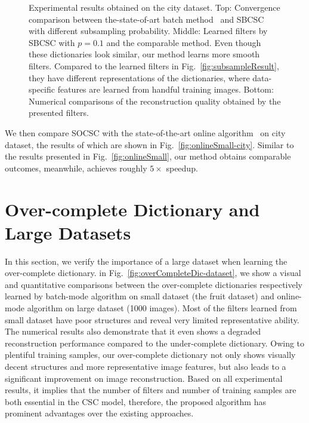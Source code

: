 \begin{figure}[h]

\caption{Experimental results obtained on the city dataset. Top: Convergence comparison between the-state-of-art batch method~\cite{heide2015fast} and SBCSC with different subsampling probability. Middle: Learned filters by SBCSC with $p=0.1$ and the comparable method. Even though these dictionaries look similar, our method learns more smooth filters. Compared to the learned filters in Fig.\ \ref{fig:subsampleResult}, they have different representations of the dictionaries, where data-specific features are learned from handful training images. Bottom: Numerical comparisons of the reconstruction quality obtained by the presented filters.}
\label{fig:subsampleResult-city}
\end{figure}

We then compare SOCSC with the state-of-the-art online algorithm~\cite{liu-2018-first} on city dataset, the results of which are shown in Fig.\ \ref{fig:onlineSmall-city}. Similar to the results presented in Fig.\ \ref{fig:onlineSmall}, our method obtains comparable outcomes, meanwhile, achieves roughly $5 \times$ speedup.

\section{Over-complete Dictionary and Large Datasets}
In this section, we verify the importance of a large dataset when learning the over-complete dictionary. in Fig.~\ref{fig:overCompleteDic-dataset}, we show a visual and quantitative comparisons between the over-complete dictionaries respectively learned by batch-mode algorithm on small dataset (the fruit dataset) and online-mode algorithm on large dataset (1000 images). Most of the filters learned from small dataset have poor structures and reveal very limited representative ability. The numerical results also demonstrate that it even shows a degraded reconstruction performance compared to the under-complete dictionary. Owing to plentiful training samples, our over-complete dictionary not only shows visually decent structures and more representative image features, but also leads to a significant improvement on image reconstruction. Based on all experimental results, it implies that the number of filters and number of training samples are both essential in the CSC model, therefore, the proposed algorithm has prominent advantages over the existing approaches.


